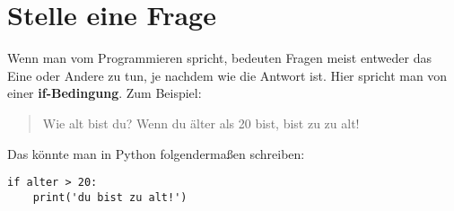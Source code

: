 

\chapter{Stelle eine Frage}\label{ch:howtoaskaquestion}

Wenn man vom Programmieren spricht, bedeuten Fragen meist entweder das Eine oder Andere zu tun, je nachdem wie die Antwort ist. Hier spricht man von einer \textbf{if-Bedingung}. Zum Beispiel:

\begin{quotation}
Wie alt bist du? Wenn du älter als 20 bist, bist zu zu alt!
\end{quotation}

Das könnte man in Python folgendermaßen schreiben:

\begin{Verbatim}[frame=single]
if alter > 20:
    print('du bist zu alt!')
\end{Verbatim}

